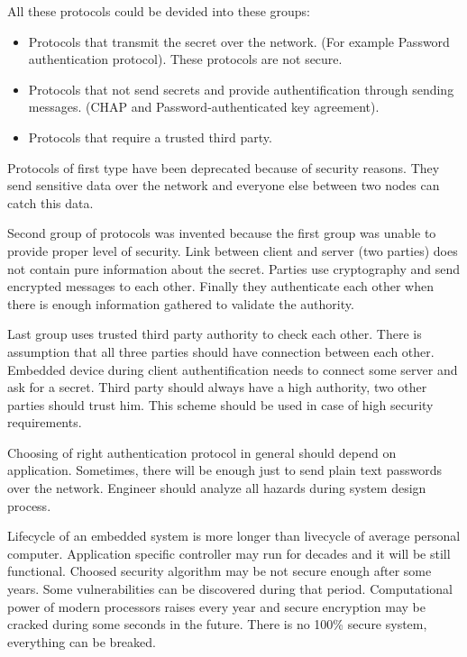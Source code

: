 All these protocols could be devided into these groups:
\begin{itemize}
  \item Protocols that transmit the secret over the network. (For example
  Password authentication protocol). These protocols are not secure.
  \item Protocols that not send secrets and provide authentification through
  sending messages. (CHAP and Password-authenticated key agreement).
  \item Protocols that require a trusted third party.  
\end{itemize}

Protocols of first type have been deprecated because of security reasons. They
send sensitive data over the network and everyone else between two nodes can
catch this data.

Second group of protocols was invented because the first group was unable to
provide proper level of security. Link between client and server (two parties)
does not contain pure information about the secret. Parties use cryptography and
send encrypted messages to each other. Finally they authenticate each other when there is enough information gathered to validate the authority.

Last group uses trusted third party authority to check each other. There is
assumption that all three parties should have connection between each other. Embedded device during
client authentification needs to connect some server and ask for a secret. Third
party should always have a high authority, two other parties should trust him.
This scheme should be used in case of high security requirements.



Choosing of right authentication protocol in general should depend on application.
Sometimes, there will be enough just to send plain text passwords over the
network.
Engineer should analyze all hazards during system design process.

Lifecycle of an embedded system is more longer than livecycle of average personal computer. Application specific controller  may run for decades and it will be still functional.
Choosed security algorithm may be not secure enough after some years. Some vulnerabilities can be discovered during that period. 
Computational power of modern processors raises every year and  secure encryption may be cracked during some seconds in the future.
There is no 100\% secure system, everything can be breaked. 

